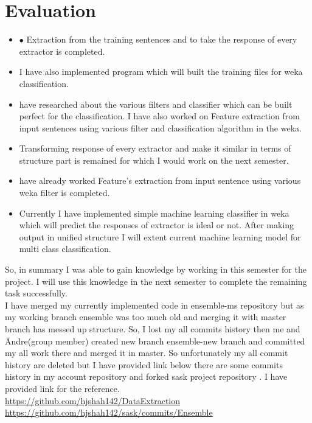\documentclass{llncs}
\begin{document}
\section{Evaluation}

 \begin {itemize}

\item[$\bullet$ ] Extraction from the training sentences and to take the response of every extractor is completed. 
\item I have also implemented program which will built the training files for weka classification. 
\item have researched about the various filters and classifier which can be built perfect for the classification. I have also worked on Feature extraction from input sentences using various filter and classification algorithm in the weka.
\item Transforming response of every extractor and make it similar in terms of structure part is remained for which I would work on the next semester.  
\item  have already worked Feature’s extraction from input sentence using various weka filter is completed.
\item Currently I have implemented simple machine learning classifier in weka which will predict the responses of extractor is ideal or not. After making output in unified structure I will extent current machine learning model for multi class classification. 

\end{itemize}
 So, in summary I was able to gain knowledge by working in this semester for the project. I will use this knowledge in the next semester to complete the remaining task successfully.\\
 I have merged my currently implemented code in ensemble-ms repository but as my working branch ensemble was too much old and merging it with master branch has messed up structure. So, I lost my all commits history then  me and  Ändre(group member) created new branch ensemble-new branch and committed my all work there and merged it in master. So unfortunately my all commit history are deleted  but I have provided link below there are some commits history in my account repository and forked sask  project repository . I have provided link for the reference.\\
\color{red}
\url{https://github.com/hjshah142/DataExtraction}\\
\url{https://github.com/hjshah142/sask/commits/Ensemble}\\
\color{black}
\end{document}
